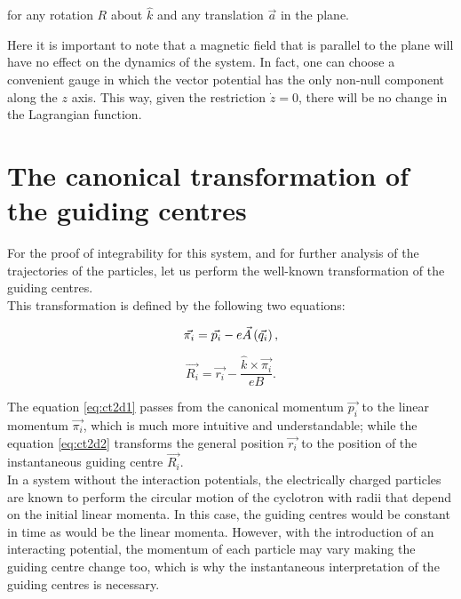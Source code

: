 for any rotation $R$ about $\hat{k}$ and any translation $\vec{a}$ in the plane.

Here it is important to note that a magnetic field that is parallel to the plane will have no effect on the dynamics of the system. In fact, one can choose a convenient gauge in which the vector potential has the only non-null component along the $z$ axis. This way, given the restriction $\dot{z} = 0$, there will be no change in the Lagrangian function.\\

\section{The canonical transformation of the guiding centres}

For the proof of integrability for this system, and for further analysis of the trajectories of the particles, let us perform the well-known transformation of the guiding centres.\\

This transformation is defined by the following two equations:

\begin{equation}
\vec{\pi_i} = \vec{p_i} - e\vec{A}\left( \vec{q_i} \right),
\label{eq:ct2d1}
\end{equation}

\begin{equation}
\vec{R_i} = \vec{r_i} - \frac{\hat{k}\times\vec{\pi_i}}{eB}.
\label{eq:ct2d2}
\end{equation}

The equation \eqref{eq:ct2d1} passes from the canonical momentum $\vec{p_i}$ to the linear momentum $\vec{\pi_i}$, which is much more intuitive and understandable; while the equation \eqref{eq:ct2d2} transforms the general position  $\vec{r_i}$ to the position of the instantaneous guiding centre $\vec{R_i}$.\\

In a system without the interaction potentials, the electrically charged particles are known to perform the circular motion of the cyclotron with radii that depend on the initial linear momenta. In this case, the guiding centres would be constant in time as would be the linear momenta. However, with the introduction of an interacting potential, the momentum of each particle may vary making the guiding centre change too, which is why the instantaneous interpretation of the guiding centres is necessary.\\

